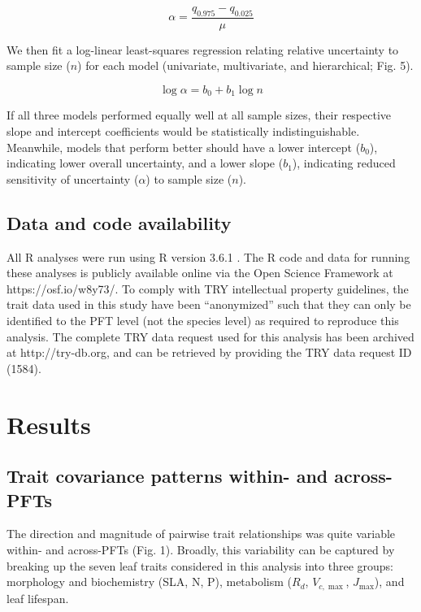 \documentclass{article}
\begin{document}
\begin{equation}
\alpha = \frac{q_{0.975} - q_{0.025}}{\mu}
\end{equation}

We then fit a log-linear least-squares regression relating relative uncertainty to sample size ($n$) for each model (univariate, multivariate, and hierarchical; Fig. 5).

\begin{equation}
\log{\alpha} = b_0 + b_1 \log{n}
\end{equation}

If all three models performed equally well at all sample sizes, their respective slope and intercept coefficients would be statistically indistinguishable.
Meanwhile, models that perform better should have
a lower intercept ($b_0$), indicating lower overall uncertainty,
and
a lower slope ($b_1$), indicating reduced sensitivity of uncertainty ($\alpha$) to sample size ($n$).

\subsection{Data and code availability}

All R analyses were run using R version 3.6.1 \citep{r_361}.
The R code and data for running these analyses is publicly available online via the Open Science Framework at https://osf.io/w8y73/.
To comply with TRY intellectual property guidelines, the trait data used in this study have been ``anonymized'' such that they can only be identified to the PFT level (not the species level) as required to reproduce this analysis.
The complete TRY data request used for this analysis has been archived at http://try-db.org, and can be retrieved by providing the TRY data request ID (1584).

\section{Results}

\subsection{Trait covariance patterns within- and across-PFTs}

The direction and magnitude of pairwise trait relationships was quite variable within- and across-PFTs (Fig. 1).
Broadly, this variability can be captured by breaking up the seven leaf traits considered in this analysis into three groups:
morphology and biochemistry (SLA, N, P),
metabolism ($R_d$, $V_{c,\max}$, $J_{\max}$),
and leaf lifespan.
\end{document}
